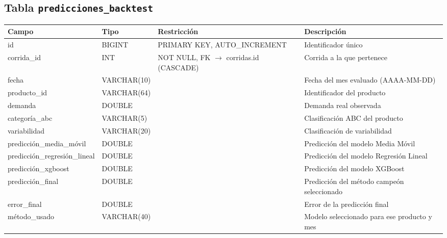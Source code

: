 \subsection*{Tabla \texttt{predicciones\_backtest}}
\begin{table}[H]
\centering
\renewcommand{\arraystretch}{1.3}
\begin{tabularx}{\textwidth}{|>{\raggedright\arraybackslash}p{3.0cm}|l|>{\raggedright\arraybackslash}p{3.2cm}|X|}
\hline
\textbf{Campo} & \textbf{Tipo} & \textbf{Restricción} & \textbf{Descripción} \\
\hline
id & BIGINT & PRIMARY KEY, AUTO\_\discretionary{}{}{}INCREMENT & Identificador único \\
\hline
corrida\_\discretionary{}{}{}id & INT & NOT NULL, FK $\to$ corridas.id (CASCADE) & Corrida a la que pertenece \\
\hline
fecha & VARCHAR(10) & & Fecha del mes evaluado (AAAA-MM-DD) \\
\hline
producto\_\discretionary{}{}{}id & VARCHAR(64) & & Identificador del producto \\
\hline
demanda & DOUBLE & & Demanda real observada \\
\hline
categoría\_\discretionary{}{}{}abc & VARCHAR(5) & & Clasificación ABC del producto \\
\hline
variabilidad & VARCHAR(20) & & Clasificación de variabilidad \\
\hline
predicción\_\discretionary{}{}{}media\_\discretionary{}{}{}móvil & DOUBLE & & Predicción del modelo Media Móvil \\
\hline
predicción\_\discretionary{}{}{}regresión\_\discretionary{}{}{}lineal & DOUBLE & & Predicción del modelo Regresión Lineal \\
\hline
predicción\_\discretionary{}{}{}xgboost & DOUBLE & & Predicción del modelo XGBoost \\
\hline
predicción\_\discretionary{}{}{}final & DOUBLE & & Predicción del método campeón seleccionado \\
\hline
error\_\discretionary{}{}{}final & DOUBLE & & Error de la predicción final \\
\hline
método\_\discretionary{}{}{}usado & VARCHAR(40) & & Modelo seleccionado para ese producto y mes \\
\hline
\end{tabularx}
\end{table}

